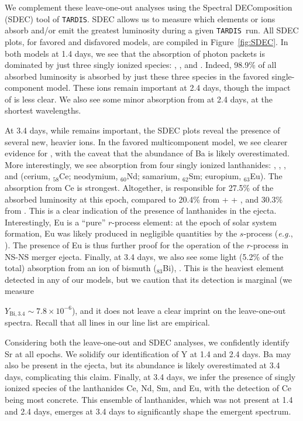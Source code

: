 \documentclass[twocolumn,twocolappendix]{aastex63}
\def\TARDIS{\texttt{TARDIS}}
\begin{document}
{{{{{{We complement these leave-one-out analyses using the Spectral DEComposition (SDEC) tool of \TARDIS. SDEC allows us to measure which elements or ions absorb and/or emit the greatest luminosity during a given \TARDIS~run. All SDEC plots, for favored and disfavored models, are compiled in Figure~\ref{fig:SDEC}. In both models at 1.4 days, we see that the absorption of photon packets is dominated by just three singly ionized species: , , and . Indeed, 98.9\% of all absorbed luminosity is absorbed by just these three species in the favored single-component model. These ions remain important at 2.4 days, though the impact of  is less clear. We also see some minor absorption from  at 2.4 days, at the shortest wavelengths.

At 3.4 days, while  remains important, the SDEC plots reveal the presence of several new, heavier ions. In the favored multicomponent model, we see clearer evidence for , with the caveat that the abundance of Ba is likely overestimated. More interestingly, we see absorption from four singly ionized lanthanides: , , , and  (cerium, ${}_{58}$Ce; neodymium, ${}_{60}$Nd; samarium, ${}_{62}$Sm; europium, ${}_{63}$Eu). The absorption from Ce is strongest. Altogether,  is responsible for 27.5\% of the absorbed luminosity at this epoch, compared to 20.4\% from  +  + , and 30.3\% from . This is a clear indication of the presence of lanthanides in the ejecta. Interestingly, Eu is a ``pure'' $r$-process element: at the epoch of solar system formation, Eu was likely produced in negligible quantities by the $s$-process (\textit{e.g.}, \citealt{bisterzo14}). The presence of Eu is thus further proof for the operation of the $r$-process in NS-NS merger ejecta. Finally, at 3.4 days, we also see some light (5.2\% of the total) absorption from an ion of bismuth (${}_{83}$Bi), . This is the heaviest element detected in any of our models, but we caution that its detection is marginal (we measure {$Y_{\mathrm{Bi},3.4} \sim 7.8 \times 10^{-6}$), and it does not leave a clear imprint on the leave-one-out spectra. Recall that all lines in our line list are empirical. 

Considering both the leave-one-out and SDEC analyses, we confidently identify Sr at all epochs. We solidify our identification of Y at 1.4 and 2.4 days. Ba may also be present in the ejecta, but its abundance is likely overestimated at 3.4 days, complicating this claim. Finally, at 3.4 days, we infer the presence of singly ionized species of the lanthanides Ce, Nd, Sm, and Eu, with the detection of Ce being most concrete. This ensemble of lanthanides, which was not present at 1.4 and 2.4 days, emerges at 3.4 days to significantly shape the emergent spectrum. 




}}}}}}}
\end{document}
